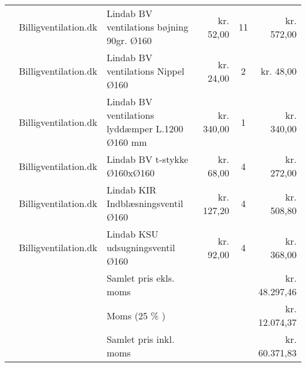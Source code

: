 \documentclass[12pt,a4paper,twoside,landscape]{article}
\begin{document}
\begin{tabular}[c]{|l|l|l|r|c|r|}
    & Billigventilation.dk & Lindab BV ventilations bøjning 90gr. Ø160 & kr. 52,00 & 11 & kr. 572,00 \\
    & Billigventilation.dk & Lindab BV ventilations Nippel Ø160 & kr. 24,00 & 2 & kr. 48,00 \\
    & Billigventilation.dk & Lindab BV ventilations lyddæmper L.1200 Ø160 mm & kr. 340,00 & 1 & kr. 340,00 \\
    & Billigventilation.dk & Lindab BV t-stykke Ø160xØ160 & kr. 68,00 & 4 & kr. 272,00 \\
    & Billigventilation.dk & Lindab KIR Indblæsningsventil Ø160 & kr. 127,20 & 4 & kr. 508,80 \\
    & Billigventilation.dk & Lindab KSU udsugningsventil Ø160 & kr. 92,00 & 4 & kr. 368,00\\
    \hline \hline
    &                 & Samlet pris ekls. moms &  & & kr. 48.297,46 \\
    &                 & Moms (25 \% ) & & & kr. 12.074,37 \\
    &                 & Samlet pris inkl. moms & & & kr. 60.371,83 \\
                    \hline

\end{tabular}
\end{document}
